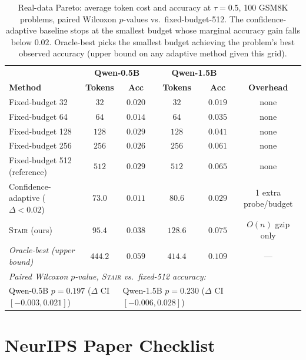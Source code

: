 \documentclass{article}
\newcommand{\method}{\textsc{Stair}}
\begin{document}
\begin{table}[h]
\centering
\caption{Real-data Pareto: average token cost and accuracy at $\tau{=}0.5$, 100 GSM8K problems, paired Wilcoxon $p$-values vs.\ fixed-budget-512.  The confidence-adaptive baseline stops at the smallest budget whose marginal accuracy gain falls below $0.02$.  Oracle-best picks the smallest budget achieving the problem's best observed accuracy (upper bound on any adaptive method given this grid).}
\label{tab:real_pareto}
\small
\begin{tabular}{lccccc}
\toprule
 & \multicolumn{2}{c}{\textbf{Qwen-0.5B}} & \multicolumn{2}{c}{\textbf{Qwen-1.5B}} & \\
\textbf{Method} & \textbf{Tokens} & \textbf{Acc} & \textbf{Tokens} & \textbf{Acc} & \textbf{Overhead} \\
\midrule
Fixed-budget 32                & $32$  & $0.020$ & $32$  & $0.019$ & none          \\
Fixed-budget 64                & $64$  & $0.014$ & $64$  & $0.035$ & none          \\
Fixed-budget 128               & $128$ & $0.029$ & $128$ & $0.041$ & none          \\
Fixed-budget 256               & $256$ & $0.026$ & $256$ & $0.061$ & none          \\
Fixed-budget 512 (reference)   & $512$ & $0.029$ & $512$ & $0.065$ & none          \\
Confidence-adaptive ($\Delta{<}0.02$) & $73.0$ & $0.011$ & $80.6$ & $0.029$ & 1 extra probe/budget \\
\method{} (ours)              & $\bm{95.4}$ & $\bm{0.038}$ & $\bm{128.6}$ & $\bm{0.075}$ & $O(n)$ gzip only \\
\midrule
\textit{Oracle-best (upper bound)} & $444.2$ & $0.059$ & $414.4$ & $0.109$ & --- \\
\midrule
\multicolumn{6}{l}{\textit{Paired Wilcoxon $p$-value, \method{} vs.\ fixed-512 accuracy:}} \\
\multicolumn{2}{l}{Qwen-0.5B $p{=}0.197$ ($\Delta$ CI $[-0.003, 0.021]$)} &
\multicolumn{3}{l}{Qwen-1.5B $p{=}0.230$ ($\Delta$ CI $[-0.006, 0.028]$)} & \\
\bottomrule
\end{tabular}
\end{table}

\newpage
\section*{NeurIPS Paper Checklist}
\end{document}
